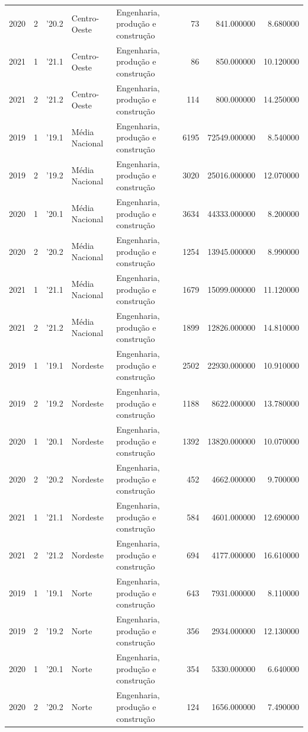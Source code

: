 \begin{longtable}{rrlllrrr}
2020 & 2 & '20.2 & Centro-Oeste & Engenharia, produção e construção & 73 & 841.000000 & 8.680000 \\
2021 & 1 & '21.1 & Centro-Oeste & Engenharia, produção e construção & 86 & 850.000000 & 10.120000 \\
2021 & 2 & '21.2 & Centro-Oeste & Engenharia, produção e construção & 114 & 800.000000 & 14.250000 \\
2019 & 1 & '19.1 & Média Nacional & Engenharia, produção e construção & 6195 & 72549.000000 & 8.540000 \\
2019 & 2 & '19.2 & Média Nacional & Engenharia, produção e construção & 3020 & 25016.000000 & 12.070000 \\
2020 & 1 & '20.1 & Média Nacional & Engenharia, produção e construção & 3634 & 44333.000000 & 8.200000 \\
2020 & 2 & '20.2 & Média Nacional & Engenharia, produção e construção & 1254 & 13945.000000 & 8.990000 \\
2021 & 1 & '21.1 & Média Nacional & Engenharia, produção e construção & 1679 & 15099.000000 & 11.120000 \\
2021 & 2 & '21.2 & Média Nacional & Engenharia, produção e construção & 1899 & 12826.000000 & 14.810000 \\
2019 & 1 & '19.1 & Nordeste & Engenharia, produção e construção & 2502 & 22930.000000 & 10.910000 \\
2019 & 2 & '19.2 & Nordeste & Engenharia, produção e construção & 1188 & 8622.000000 & 13.780000 \\
2020 & 1 & '20.1 & Nordeste & Engenharia, produção e construção & 1392 & 13820.000000 & 10.070000 \\
2020 & 2 & '20.2 & Nordeste & Engenharia, produção e construção & 452 & 4662.000000 & 9.700000 \\
2021 & 1 & '21.1 & Nordeste & Engenharia, produção e construção & 584 & 4601.000000 & 12.690000 \\
2021 & 2 & '21.2 & Nordeste & Engenharia, produção e construção & 694 & 4177.000000 & 16.610000 \\
2019 & 1 & '19.1 & Norte & Engenharia, produção e construção & 643 & 7931.000000 & 8.110000 \\
2019 & 2 & '19.2 & Norte & Engenharia, produção e construção & 356 & 2934.000000 & 12.130000 \\
2020 & 1 & '20.1 & Norte & Engenharia, produção e construção & 354 & 5330.000000 & 6.640000 \\
2020 & 2 & '20.2 & Norte & Engenharia, produção e construção & 124 & 1656.000000 & 7.490000 \\

\end{longtable}
